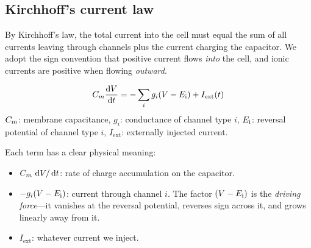 \begin{center}

\end{center}

\subsection{Kirchhoff's current law}

By Kirchhoff's law, the total current into the cell must equal the sum of all currents leaving through channels plus the current charging the capacitor. We adopt the sign convention that positive current flows \emph{into} the cell, and ionic currents are positive when flowing \emph{outward}.

\begin{keyequation}
\begin{equation}
  C_m\frac{\mathop{}\!\mathrm{d} V}{\mathop{}\!\mathrm{d} t} = -\sum_i g_i(V - E_{\mathrm{i}}) + I_{\text{ext}}(t)
  \label{eq:membrane}
\end{equation}
\tcblower
$C_m$: membrane capacitance, $g_i$: conductance of channel type $i$, $E_{\mathrm{i}}$: reversal potential of channel type $i$, $I_{\text{ext}}$: externally injected current.
\end{keyequation}

\begin{aside}
Each term has a clear physical meaning:
\begin{itemize}[itemsep=2pt]
  \item $C_m\,\mathop{}\!\mathrm{d} V/\mathop{}\!\mathrm{d} t$: rate of charge accumulation on the capacitor.
  \item $-g_i(V - E_{\mathrm{i}})$: current through channel $i$. The factor $(V - E_{\mathrm{i}})$ is the \emph{driving force}---it vanishes at the reversal potential, reverses sign across it, and grows linearly away from it.
  \item $I_{\text{ext}}$: whatever current we inject.
\end{itemize}
\end{aside}

